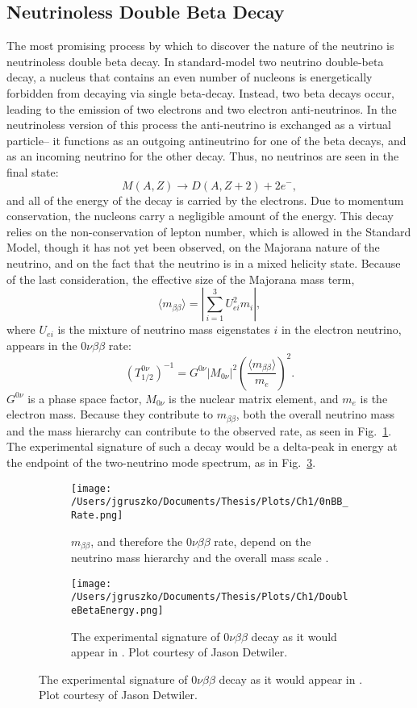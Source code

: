\subsection{Neutrinoless Double Beta Decay}
The most promising process by which to discover the nature of the neutrino is neutrinoless double beta decay. In standard-model two neutrino double-beta decay, a nucleus that contains an even number of nucleons is energetically forbidden from decaying via single beta-decay. Instead, two beta decays occur, leading to the emission of two electrons and two electron anti-neutrinos. In the neutrinoless version of this process the anti-neutrino is exchanged as a virtual particle-- it functions as an outgoing antineutrino for one of the beta decays, and as an incoming neutrino for the other decay. Thus, no neutrinos are seen in the final state:
$$M(A, Z) \rightarrow D(A, Z+2) + 2 e^{-},$$
 and all of the energy of the decay is carried by the electrons. Due to momentum conservation, the nucleons carry a negligible amount of the energy. This decay relies on the non-conservation of lepton number, which is allowed in the Standard Model, though it has not yet been observed, on the Majorana nature of the neutrino, and on the fact that the neutrino is in a mixed helicity state. Because of the last consideration, the effective size of the Majorana mass term, 
 $$\langle m_{\beta\beta} \rangle = |\sum\limits_{i=1}^3 U^2_{ei}m_i|,$$
 where $U_{ei}$ is the mixture of neutrino mass eigenstates $i$ in the electron neutrino, appears in the $0\nu\beta\beta$ rate:
 $$(T_{1/2}^{0\nu})^{-1} = G^{0\nu}|M_{0\nu}|^{2}\left(\frac{\langle m_{\beta\beta} \rangle}{m_e}\right)^2 .$$
 $G^{0\nu}$ is a phase space factor, $M_{0\nu}$ is the nuclear matrix element, and $m_e$ is the electron mass. Because they contribute to $m_{\beta\beta}$, both the overall neutrino mass and the mass hierarchy can contribute to the observed rate, as seen in Fig.~\ref{0nBBrate}. The experimental signature of such a decay would be a delta-peak in energy at the endpoint of the two-neutrino mode spectrum, as in Fig.~\ref{0nBBspectrum}.
 
 \begin{figure}[h]
 \centering
    \begin{subfigure}[b]{.40\textwidth}
      \texttt{[image: /Users/jgruszko/Documents/Thesis/Plots/Ch1/0nBB\_Rate.png]}
       \caption{$m_{\beta\beta}$, and therefore the $0\nu\beta\beta$ rate, depend on the neutrino mass hierarchy and the overall mass scale \cite{ZuberINT2015} .}
        \label{0nBBrate}
        \end{subfigure}   
         \hfil
        \begin{subfigure}[b]{0.4\textwidth}
      \texttt{[image: /Users/jgruszko/Documents/Thesis/Plots/Ch1/DoubleBetaEnergy.png]} 
      \caption{The experimental signature of $0\nu\beta\beta$ decay as it would appear in . Plot courtesy of Jason Detwiler.}
      \label{0nBBspectrum}
    \end{subfigure}   
\end{figure}
 
